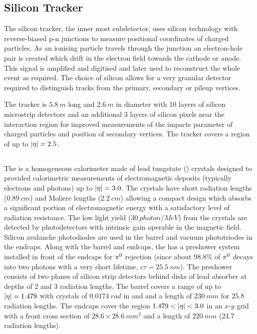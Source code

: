 \subsection{Silicon Tracker}

The silicon tracker, the inner most subdetector, uses silicon technology with
reverse-biased p-n junctions to measure positional coordinates of charged
particles. As an ionising particle travels through the junction an electron-hole
pair is created which drift in the electron field towards the cathode or anode.
This signal is amplified and digitised and later used to reconstruct the whole
event as required. The choice of silicon allows for a very granular detector
required to distinguish tracks from the primary, secondary or pileup vertices.

The tracker is ${\SI{5.8}{m}}$ long and ${\SI{2.6}{m}}$ in diameter with 10
layers of silicon microstrip detectors and an additional 3 layers of silicon
pixels near the interaction region for improved measurements of the impacts
parameter of charged particles and position of secondary vertices. The tracker
covers a region of up to ${|\eta|=2.5}$.

\subsection{\ECAL}

The \ECAL is a homogeneous calorimeter made of lead tungstate (\pbwo) crystals
designed to provided calorimetric measurements of electromagnetic deposits
(typically electrons and photons) up to ${|\eta|=3.0}$. The crystals have
short radiation lengths (${\SI{0.89}{cm}}$) and Moliere lengths
(${\SI{2.2}{cm}}$) allowing a compact design which absorbs a significant
portion of electromagnetic energy with a satisfactory level of radiation
resistance. The low light yield (${\SI{30}{photon/MeV}}$) from the crystals are
detected by photodetectors with intrinsic gain operable in the magnetic field.
Silicon avalanche photodiodes are used in the barrel and vacuum phototriodes in
the endcaps. Along with the barrel and endcaps, the \ECAL has a preshower system
installed in front of the endcaps for ${\pi^{0}}$ rejection (since about
${98.8\%}$ of ${\pi^{0}}$ decays into two photons with a very short lifetime,
${c\tau=\SI{25.5}{nm}}$). The preshower consists of two planes of silicon strip
detectors behind disks of lead absorber at depths of 2 and 3 radiation lengths.
The barrel covers a range of up to ${|\eta|=1.479}$ with crystals of
${\SI{0.0174}{rad}}$ in \dphi and \deta and a length of ${\SI{230}{mm}}$ for
$25.8$ radiation lengths. The endcaps cover the region ${1.479<\aeta<3.0}$ in
an $x$-$y$ grid with a front cross section of ${28.6\times\SI{28.6}{mm^2}}$ and
a length of ${\SI{220}{mm}}$ (24.7 radiation lengths).

